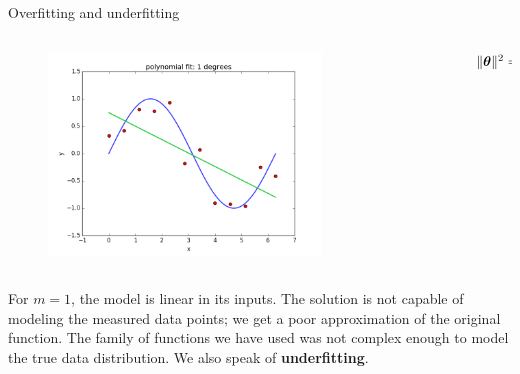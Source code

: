\documentclass[xcolor=pdftex,dvipsnames,table,mathserif]{beamer}
\begin{document}
\begin{frame}{Overfitting and underfitting}
\begin{columns}
\begin{column}{.8\textwidth}
\begin{figure}[htb]
	\includegraphics[width=0.75\textwidth]{../graphics/polyfit_degree_1.png}
\end{figure}
\end{column}
\begin{column}{.2\textwidth}
$\| \boldsymbol{\theta} \|^2 = 0.67$
\end{column}
\end{columns}
For $m=1$, the model is linear in its inputs. The solution is not capable of modeling the measured data points; we get a poor approximation of the original function. The family of functions we have used was not complex enough to model the true data distribution. We also speak of \textbf{underfitting}.
\end{frame}
\end{document}
